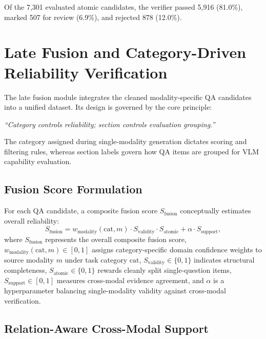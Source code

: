 Of the 7,301 evaluated atomic candidates, the verifier passed 5,916 (81.0\%), marked 507 for review (6.9\%), and rejected 878 (12.0\%).


\section{Late Fusion and Category-Driven Reliability Verification}
\label{sec:late_fusion_reliability}

The late fusion module integrates the cleaned modality-specific QA candidates into a unified dataset.
Its design is governed by the core principle:
\begin{center}
    \textit{``Category controls reliability; section controls evaluation grouping.''}
\end{center}
The category assigned during single-modality generation dictates scoring and filtering rules,
whereas section labels govern how QA items are grouped for VLM capability evaluation.

\subsection{Fusion Score Formulation}

For each QA candidate, a composite fusion score $S_{\text{fusion}}$ conceptually estimates overall reliability:
\begin{equation}
    S_{\text{fusion}} = w_{\text{modality}}(\text{cat}, m) \cdot S_{\text{validity}} \cdot S_{\text{atomic}} + \alpha \cdot S_{\text{support}},
    \label{eq:fusion_score}
\end{equation}
where $S_{\text{fusion}}$ represents the overall composite fusion score, $w_{\text{modality}}(\text{cat}, m) \in [0, 1]$ assigns category-specific domain confidence weights to source modality $m$ under task category $\text{cat}$, $S_{\text{validity}} \in \{0, 1\}$ indicates structural completeness, $S_{\text{atomic}} \in \{0, 1\}$ rewards cleanly split single-question items, $S_{\text{support}} \in [0, 1]$ measures cross-modal evidence agreement, and $\alpha$ is a hyperparameter balancing single-modality validity against cross-modal verification.

\subsection{Relation-Aware Cross-Modal Support}

